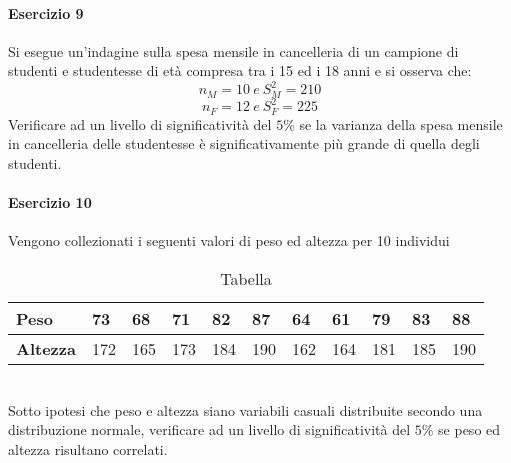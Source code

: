 \documentclass[12pt]{article}
\begin{document}
    \paragraph{Esercizio 9}
    Si esegue un’indagine sulla spesa mensile in cancelleria di un campione di studenti e studentesse di età compresa tra i 15 ed i 18 anni e si osserva che:
    $$ n_M = 10 \ e \ S^2_M = 210$$
    $$ n_F = 12 \ e \ S^2_F = 225$$
    Verificare ad un livello di significatività del $5\%$ se la varianza della spesa mensile in cancelleria delle studentesse è significativamente più grande di quella degli studenti.
    \newpage
    \paragraph{Esercizio 10}
    Vengono collezionati i seguenti valori di peso ed altezza per 10 individui
    \begin{table}[!htb]
        \centering
        \begin{tabular}{|l|l|l|l|l|l|l|l|l|l|l|}
        \hline
        \textbf{Peso}                          & 73                       & 68                       & 71                       & 82  & 87  & 64  & 61  & 79  & 83  & 88  \\ \hline
        \multicolumn{1}{|c|}{\textbf{Altezza}} & \multicolumn{1}{c|}{172} & \multicolumn{1}{c|}{165} & \multicolumn{1}{c|}{173} & 184 & 190 & 162 & 164 & 181 & 185 & 190 \\ \hline
        \end{tabular}
        \caption{Tabella}
        \label{tab:my-table3}
    \end{table}
    \\Sotto ipotesi che peso e altezza siano variabili casuali distribuite secondo una distribuzione normale, verificare ad un livello di significatività del $5\%$ se peso ed altezza risultano correlati.
\end{document}
